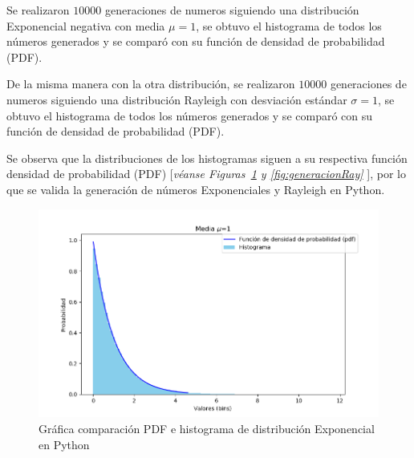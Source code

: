 Se realizaron $10000$ generaciones de numeros siguiendo una distribución Exponencial negativa con media $\mu =1$, se obtuvo el histograma de todos los números generados y se comparó con su función de densidad de probabilidad (PDF).\newline

De la misma manera con la otra distribución, se realizaron $10000$ generaciones de numeros siguiendo una distribución Rayleigh con desviación estándar $\sigma = 1$, se obtuvo el histograma de todos los números generados y se comparó con su función de densidad de probabilidad (PDF).\newline

Se observa que la distribuciones de los histogramas siguen a su respectiva función densidad de probabilidad (PDF) [\textit{véanse Figuras~\ref{fig:generacionExpon} y \ref{fig:generacionRay} }], por lo que se valida la generación de números Exponenciales y Rayleigh en Python.\newline

\begin{figure}[th]
    \centering
    \includegraphics[scale=.6]{Figures/ExponentialDisitribution.png}
    \decoRule
    \caption[Gráfica comparación PDF e histograma de distribución Exponencial en Python]{Gráfica comparación PDF e histograma de distribución Exponencial en Python}
    \label{fig:generacionExpon}
\end{figure}

